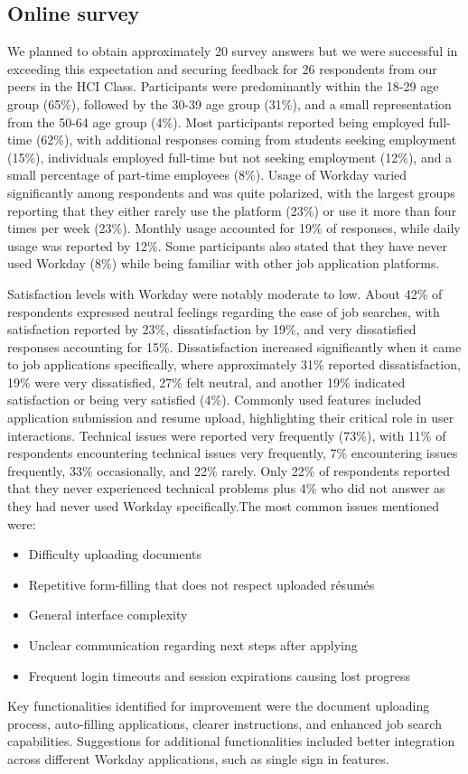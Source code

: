 \documentclass[
	letterpaper, %
]{jdf}
\begin{document}
\begin{sloppypar}
\subsection{Online survey}
We planned to obtain approximately 20 survey answers but we were successful in exceeding this expectation and securing feedback for 26 respondents from our peers in the HCI Class. Participants were predominantly within the 18-29 age group (65\%), followed by the 30-39 age group (31\%), and a small representation from the 50-64 age group (4\%). Most participants reported being employed full-time (62\%), with additional responses coming from students seeking employment (15\%), individuals employed full-time but not seeking employment (12\%), and a small percentage of part-time employees (8\%). Usage of Workday varied significantly among respondents and was quite polarized, with the largest groups reporting that they either rarely use the platform (23\%) or use it more than four times per week (23\%). Monthly usage accounted for 19\% of responses, while daily usage was reported by 12\%. Some participants also stated that they have never used Workday (8\%) while being familiar with other job application platforms. 

Satisfaction levels with Workday were notably moderate to low. About 42\% of respondents expressed neutral feelings regarding the ease of job searches, with satisfaction reported by 23\%, dissatisfaction by 19\%, and very dissatisfied responses accounting for 15\%. Dissatisfaction increased significantly when it came to job applications specifically, where approximately 31\% reported dissatisfaction, 19\% were very dissatisfied, 27\% felt neutral, and another 19\% indicated satisfaction or being very satisfied (4\%). Commonly used features included application submission and resume upload, highlighting their critical role in user interactions. Technical issues were reported very frequently (73\%), with 11\% of respondents encountering technical issues very frequently, 7\% encountering issues frequently, 33\% occasionally, and 22\% rarely. Only 22\% of respondents reported that they never experienced technical problems plus 4\% who did not answer as they had never used Workday specifically.The most common issues mentioned were:
\begin{itemize}
\item Difficulty uploading documents
\item Repetitive form-filling that does not respect uploaded résumés
\item General interface complexity
\item Unclear communication regarding next steps after applying
\item Frequent login timeouts and session expirations causing lost progress
\end{itemize}
Key functionalities identified for improvement were the document uploading process, auto-filling applications, clearer instructions, and enhanced job search capabilities. Suggestions for additional functionalities included better integration across different Workday applications, such as single sign in features.


\end{sloppypar}
\end{document}
